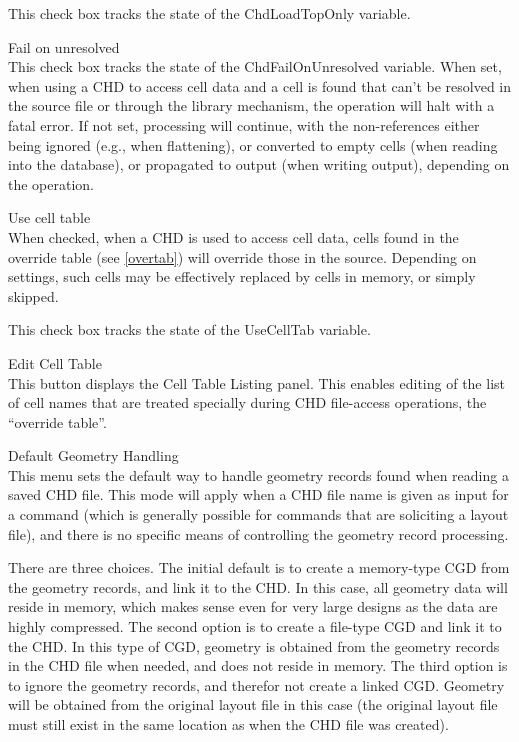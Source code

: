 \begin{description}
This check box tracks the state of the {\et ChdLoadTopOnly} variable.

\item{\cb Fail on unresolved}\\
This check box tracks the state of the {\et ChdFailOnUnresolved}
variable.  When set, when using a CHD to access cell data and a cell
is found that can't be resolved in the source file or through the
library mechanism, the operation will halt with a fatal error.  If not
set, processing will continue, with the non-references either being
ignored (e.g., when flattening), or converted to empty cells (when
reading into the database), or propagated to output (when writing
output), depending on the operation.

\item{\cb Use cell table}\\
When checked, when a CHD is used to access cell data, cells found in
the override table (see \ref{overtab}) will override those in the
source.  Depending on settings, such cells may be effectively replaced
by cells in memory, or simply skipped.

This check box tracks the state of the {\et UseCellTab} variable.

\item{\cb Edit Cell Table}\\
This button displays the {\cb Cell Table Listing} panel.  This enables
editing of the list of cell names that are treated specially during
CHD file-access operations, the ``override table''.

\item{\cb Default Geometry Handling}\\
This menu sets the default way to handle geometry records found when
reading a saved CHD file.  This mode will apply when a CHD file name
is given as input for a command (which is generally possible for
commands that are soliciting a layout file), and there is no specific
means of controlling the geometry record processing.

There are three choices.  The initial default is to create a
memory-type CGD from the geometry records, and link it to the CHD.  In
this case, all geometry data will reside in memory, which makes sense
even for very large designs as the data are highly compressed.  The
second option is to create a file-type CGD and link it to the CHD.  In
this type of CGD, geometry is obtained from the geometry records in
the CHD file when needed, and does not reside in memory.  The third
option is to ignore the geometry records, and therefor not create a
linked CGD.  Geometry will be obtained from the original layout file
in this case (the original layout file must still exist in the same
location as when the CHD file was created).
\end{description}


